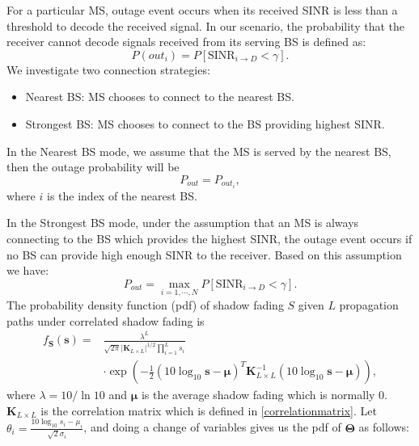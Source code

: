 \documentclass[journal,10pt]{IEEEtran}
\begin{document}
 \par For a particular MS, outage event occurs when its received SINR is less than a threshold to decode the received signal. In our scenario, the probability that the receiver cannot decode signals received from its serving BS is defined as:
 \begin{equation}
 P(out_{i}) = P[\text{SINR}_{i\to D} < \gamma].
 \end{equation}
 We investigate two connection strategies: 
 \begin{itemize}
 \item Nearest BS: MS chooses to connect to the nearest BS.
 \item Strongest BS: MS chooses to connect to the BS providing highest SINR.
 \end{itemize}
 \par In the Nearest BS mode, we assume that the MS is served by the nearest BS, then the outage probability will be 
 \begin{equation}
 P_{out} = P_{out_{i}},
 \end{equation} 
 where $i$ is the index of the nearest BS. 
 \par In the Strongest BS mode, under the assumption that an MS is always connecting to the BS which provides the highest SINR, the outage event occurs if no BS can provide high enough SINR to the receiver. Based on this assumption we have:
 \begin{equation}
 P_{out} = \max_{i = 1,\cdots,N} P[\text{SINR}_{i\to D}<\gamma].
 \end{equation}
 The probability density function (pdf) of shadow fading $S$ given $L$ propagation paths under correlated shadow fading is
 \begin{equation}
 \begin{split}
 f_{\mathbf{S}}(\mathbf{s}) = &\frac{\lambda^{L}}{\sqrt{2\pi}|\mathbf{K}_{L\times L}|^{1/2}\prod_{i=1}^{L}s_{i}}\\
 &\cdot\exp(-\frac{1}{2}(10\log_{10}\mathbf{s}-\boldsymbol{\mu})^{T}\mathbf{K}_{L\times L}^{-1}(10\log_{10}\mathbf{s}-\boldsymbol{\mu})),
 \end{split}
 \end{equation}
 where $\lambda = 10/\ln10$ and $\boldsymbol{\mu}$ is the average shadow fading which is normally $0$. $\mathbf{K}_{L\times L}$ is the correlation matrix which is defined in \eqref{correlationmatrix}. Let $\theta_{i} = \frac{10\log_{10}s_{i}-\mu_{i}}{\sqrt{2}\sigma_{i}}$, and doing a change of variables gives us the pdf of $\mathbf{\Theta}$ as follows:
\end{document}
